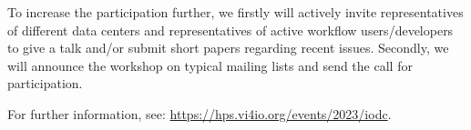 \documentclass[a4paper,10pt]{article}
\begin{document}
To increase the participation further, we firstly will actively invite representatives of different data centers and representatives of active workflow users/developers to give a talk and/or submit short papers regarding recent issues.
Secondly, we will announce the workshop on typical mailing lists and send the call for participation.


For further information, see:
\url{https://hps.vi4io.org/events/2023/iodc}.
\end{document}
